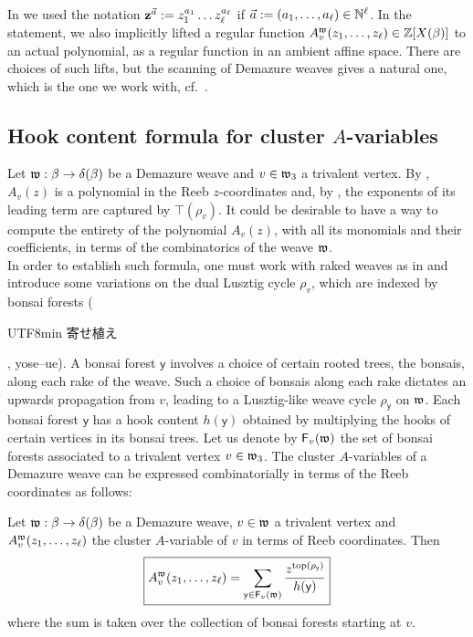 \noindent In  we used the notation ${\bf z}^{\vec{a}}:=z_1^{a_1}\ldots z_\ell^{a_\ell}$ if $\vec{a}:=(a_1,\ldots,a_\ell)\in\mathbb{N}^\ell$. In the statement, we also implicitly lifted a regular function $A^{\mathfrak{w}}_v(z_1,\ldots,z_\ell)\in\mathbb{Z}[X(\beta)]$ to an actual polynomial, as a regular function in an ambient affine space. There are choices of such lifts, but the scanning of Demazure weaves gives a natural one, which is the one we work with, cf.~\cite[Section 7.2]{CGGLSS25}.

\subsection{Hook content formula for cluster $A$-variables}\label{ssec:hook_content_formula} Let $\mathfrak{w}:\beta\to\delta(\beta)$ be a Demazure weave and $v\in\mathfrak{w}_3$ a trivalent vertex. By , $A_v(z)$ is a polynomial in the Reeb $z$-coordinates and, by , the exponents of its leading term are captured by $\top(\rho_v)$. It could be desirable to have a way to compute the entirety of the polynomial $A_v(z)$, with all its monomials and their coefficients, in terms of the combinatorics of the weave $\mathfrak{w}$.\\

In order to establish such formula, one must work with raked weaves as in \cite[Section 5.1]{CGGLSS25} and introduce some variations on the dual Lusztig cycle $\rho_v$, which are indexed by bonsai forests (\begin{CJK*}{UTF8}{min}
寄せ植え
\end{CJK*}, yose--ue). A bonsai forest $\mathsf{y}$ involves a choice of certain rooted trees, the bonsais, along each rake of the weave. Such a choice of bonsais along each rake dictates an upwards propagation from $v$, leading to a Lusztig-like weave cycle $\rho_{\mathsf{y}}$ on $\mathfrak{w}$. Each bonsai forest $\mathsf{y}$ has a hook content $h(\mathsf{y})$ obtained by multiplying the hooks of certain vertices in its bonsai trees. Let us denote by $\mathsf{F}_v(\mathfrak{w})$ the set of bonsai forests associated to a trivalent vertex $v\in\mathfrak{w}_3$. The cluster $A$-variables of a Demazure weave can be expressed combinatorially in terms of the Reeb coordinates as follows:

\begin{theorem}\label{thm:hook_content_cluster_A_variables}
Let $\mathfrak{w}:\beta\to\delta(\beta)$ be a Demazure weave, $v\in\mathfrak{w}$ a trivalent vertex and $A^{\mathfrak{w}}_v(z_1,\ldots,z_\ell)$ the cluster $A$-variable of $v$ in terms of Reeb coordinates. Then
\begin{equation}\label{eq:hook_formula}
\boxed{A^{\mathfrak{w}}_v(z_1,\ldots,z_\ell)=\sum_{\mathsf{y}\in\mathsf{F}_v(\mathfrak{w})} \frac{z^{\operatorname{top}(\rho_{\mathsf{y}})}}{h(\mathsf{y})} }
\end{equation}
where the sum is taken over the collection of bonsai forests starting at $v$.\sbs
\end{theorem}

